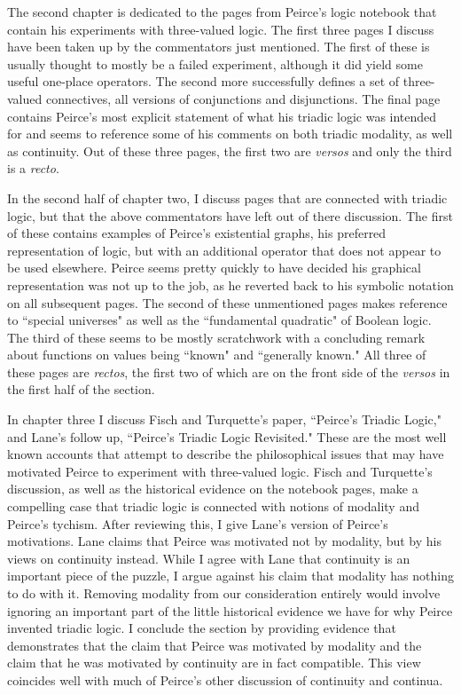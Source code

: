 \documentclass[12pt]{article}
\begin{document}
The second chapter is dedicated to the pages from Peirce's logic notebook that contain his experiments with three-valued logic. The first three pages I discuss have been taken up by the commentators just mentioned. The first of these is usually thought to mostly be a failed experiment, although it did yield some useful one-place operators. The second more successfully defines a set of three-valued connectives, all versions of conjunctions and disjunctions. The final page contains Peirce's most explicit statement of what his triadic logic was intended for and seems to reference some of his comments on both triadic modality, as well as continuity. Out of these three pages, the first two are \textit{versos} and only the third is a \textit{recto}.

In the second half of chapter two, I discuss pages that are connected with triadic logic, but that the above commentators have left out of there discussion. The first of these contains examples of Peirce's existential graphs, his preferred representation of logic, but with an additional operator that does not appear to be used elsewhere. Peirce seems pretty quickly to have decided his graphical representation was not up to the job, as he reverted back to his symbolic notation on all subsequent pages. The second of these unmentioned pages makes reference to ``special universes" as well as the ``fundamental quadratic" of Boolean logic. The third of these seems to be mostly scratchwork with a concluding remark about functions on values being ``known" and ``generally known." All three of these pages are \textit{rectos}, the first two of which are on the front side of the \textit{versos} in the first half of the section.

In chapter three I discuss Fisch and Turquette's paper, ``Peirce's Triadic Logic," and Lane's follow up, ``Peirce's Triadic Logic Revisited." These are the most well known accounts that attempt to describe the philosophical issues that may have motivated Peirce to experiment with three-valued logic. Fisch and Turquette's discussion, as well as the historical evidence on the notebook pages, make a compelling case that triadic logic is connected with notions of modality and Peirce's tychism. After reviewing this, I give Lane's version of Peirce's motivations. Lane claims that Peirce was motivated not by modality, but by his views on continuity instead. While I agree with Lane that continuity is an important piece of the puzzle, I argue against his claim that modality has nothing to do with it. Removing modality from our consideration entirely would involve ignoring an important part of the little historical evidence we have for why Peirce invented triadic logic. I conclude the section by providing evidence that demonstrates that the claim that Peirce was motivated by modality and the claim that he was motivated by continuity are in fact compatible. This view coincides well with much of Peirce's  other discussion of continuity and continua.
\end{document}
